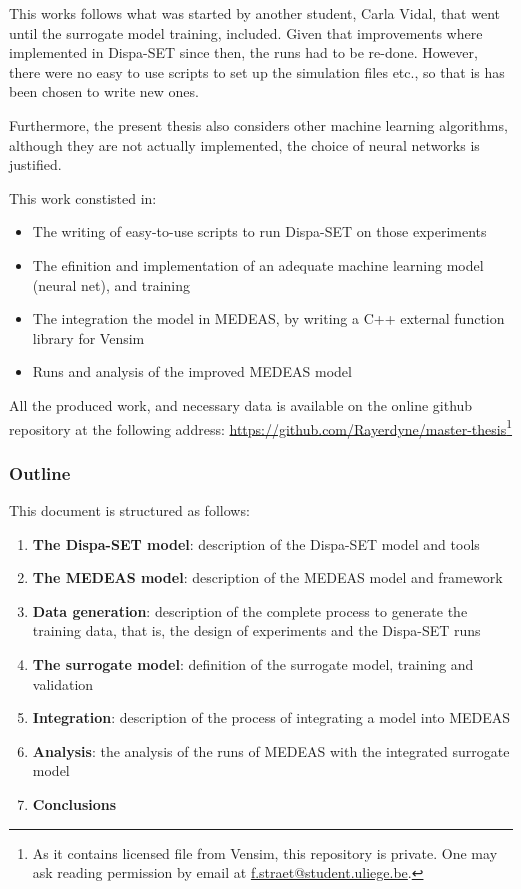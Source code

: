 This works follows what was started by another student, Carla Vidal, that went until the surrogate model training, included. Given that improvements where implemented in Dispa-SET since then, the runs had to be re-done. However, there were no easy to use scripts to set up the simulation files etc., so that is has been chosen to write new ones.

Furthermore, the present thesis also considers other machine learning algorithms, although they are not actually implemented, the choice of neural networks is justified.

This work constisted in:
\begin{itemize}
    \item The writing of easy-to-use scripts to run Dispa-SET on those experiments
    \item The efinition and implementation of an adequate machine learning model (neural net), and training
    \item The integration the model in MEDEAS, by writing a C++ external function library for Vensim
    \item Runs and analysis of the improved MEDEAS model
\end{itemize}

All the produced work, and necessary data is available on the online github repository at the following address: \href{https://github.com/Rayerdyne/master-thesis}{https://github.com/Rayerdyne/master-thesis}\footnote{As it contains licensed file from Vensim, this repository is private. One may ask reading permission by email at \href{mailto:f.straet@student.uliege.be}{f.straet@student.uliege.be}.}

\subsubsection{Outline}

This document is structured as follows:

\begin{enumerate}
    \item \textbf{The Dispa-SET model}: description of the Dispa-SET model and tools
    \item \textbf{The MEDEAS model}: description of the MEDEAS model and framework
    \item \textbf{Data generation}: description of the complete process to generate the training data, that is, the design of experiments and the Dispa-SET runs
    \item \textbf{The surrogate model}: definition of the surrogate model, training and validation
    \item \textbf{Integration}: description of the process of integrating a model into MEDEAS
    \item \textbf{Analysis}: the analysis of the runs of MEDEAS with the integrated surrogate model
    \item \textbf{Conclusions}
\end{enumerate}
